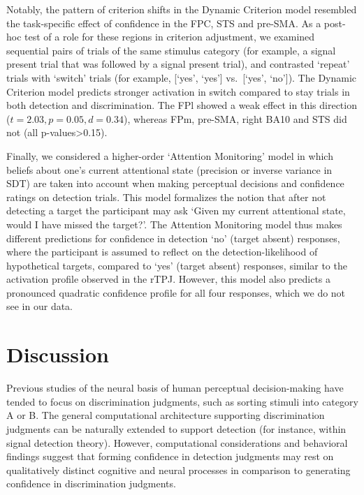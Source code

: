 \documentclass[12pt,twoside]{reedthesis}
\begin{document}
Notably, the pattern of criterion shifts in the Dynamic Criterion model resembled the task-specific effect of confidence in the FPC, STS and pre-SMA. As a post-hoc test of a role for these regions in criterion adjustment, we examined sequential pairs of trials of the same stimulus category (for example, a signal present trial that was followed by a signal present trial), and contrasted `repeat' trials with `switch' trials (for example, {[}`yes', `yes'{]} vs.~{[}`yes', `no'{]}). The Dynamic Criterion model predicts stronger activation in switch compared to stay trials in both detection and discrimination. The FPl showed a weak effect in this direction (\(t = 2.03, p=0.05, d = 0.34\)), whereas FPm, pre-SMA, right BA10 and STS did not (all p-values\textgreater0.15).

Finally, we considered a higher-order `Attention Monitoring' model in which beliefs about one's current attentional state (precision or inverse variance in SDT) are taken into account when making perceptual decisions and confidence ratings on detection trials. This model formalizes the notion that after not detecting a target the participant may ask `Given my current attentional state, would I have missed the target?'. The Attention Monitoring model thus makes different predictions for confidence in detection `no' (target absent) responses, where the participant is assumed to reflect on the detection-likelihood of hypothetical targets, compared to `yes' (target absent) responses, similar to the activation profile observed in the rTPJ. However, this model also predicts a pronounced quadratic confidence profile for all four responses, which we do not see in our data.

\hypertarget{discussion-3}{%
\section{Discussion}\label{discussion-3}}

Previous studies of the neural basis of human perceptual decision-making have tended to focus on discrimination judgments, such as sorting stimuli into category A or B. The general computational architecture supporting discrimination judgments can be naturally extended to support detection (for instance, within signal detection theory). However, computational considerations and behavioral findings suggest that forming confidence in detection judgments may rest on qualitatively distinct cognitive and neural processes in comparison to generating confidence in discrimination judgments.
\end{document}
